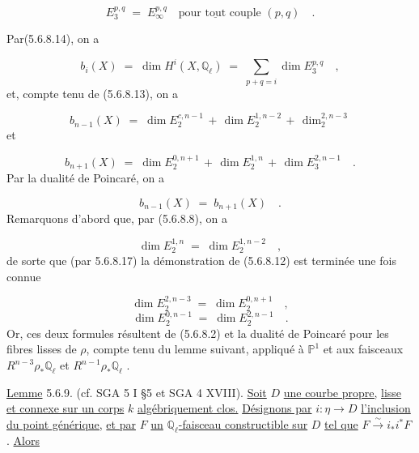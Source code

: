 \begin{equation}\tag{5.6.8.14}
E_3^{p,q} \;=\; E_\infty^{p,q} \quad \text{pour } \underline{\text{tout}} \text{ couple } (p,q) \quad .
\end{equation}


Par(5.6.8.14), on a

\begin{equation*}
b_i(X) \;=\; \dim H^i(X,\mathbb{Q}_\ell) \;=\; \sum_{p+q=i} \dim E_3^{p,q} \quad ,
\end{equation*}
et, compte tenu de (5.6.8.13), on a

\begin{equation}\tag{5.6.8.15}
b_{n-1}(X) \;=\; \dim E_2^{c,n-1} \,+\, \dim E_2^{1,n-2} \,+\, \dim_2^{2,n-3}
\end{equation}
et

\begin{equation}\tag{5.6.8.16}
b_{n+1}(X) \;=\; \dim E_2^{0,n+1} \,+\, \dim E_2^{1,n} \,+\, \dim E_3^{2,n-1} \quad .
\end{equation}
Par la dualité de Poincaré, on a

\begin{equation}\tag{5.6.8.17}
b_{n-1}(X) \;=\; b_{n+1}(X) \quad .
\end{equation}
Remarquons d'abord que, par (5.6.8.8), on a

\begin{equation*}
\dim E_2^{1,n} \;=\; \dim E_2^{1,n-2} \quad ,
\end{equation*}
de sorte que (par 5.6.8.17) la démonstration de (5.6.8.12) est terminée une fois connue

\begin{equation}\tag{5.6.8.18}
\dim E_2^{2,n-3} \;=\; \dim E_2^{0,n+1} \quad ,
\end{equation}
\begin{equation}\tag{5.6.8.19}
\dim E_2^{0,n-1} \;=\; \dim E_2^{2,n-1} \quad .
\end{equation}
Or, ces deux formules résultent de (5.6.8.2) et la dualité de Poincaré pour les fibres lisses de $\rho$, compte tenu du lemme suivant, appliqué à $\mathbb{P}^1$ et aux faisceaux $R^{n-3}\rho_*\mathbb{Q}_\ell$ et $R^{n-1}\rho_*\mathbb{Q}_\ell$ .



\underline{Lemme} 5.6.9. (cf. SGA 5 I \S 5 et SGA 4 XVIII\quad ). \underline{Soit} $D$ \underline{une courbe propre,} \underline{lisse et connexe sur un corps} $k$ \underline{algébriquement clos.} \underline{Désignons par} $i : \eta \longrightarrow D$ \underline{l'inclusion du point générique,} \underline{et par} $F$ \underline{un} $\mathbb{Q}_\ell$\underline{-faisceau constructible sur} $D$ \underline{tel que} $F \overset{\sim}{\longrightarrow} i_*i^*F$ . \underline{Alors}

